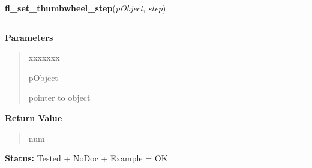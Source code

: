     \label{xformslib:library:fl_set_thumbwheel_step}

    \vspace{0.5ex}

\hspace{.8\funcindent}\begin{boxedminipage}{\funcwidth}

    \raggedright \textbf{fl\_set\_thumbwheel\_step}(\textit{pObject}, \textit{step})

    \vspace{-1.5ex}

    \rule{\textwidth}{0.5\fboxrule}
\setlength{\parskip}{2ex}
\setlength{\parskip}{1ex}
      \textbf{Parameters}
      \vspace{-1ex}

      \begin{quote}
        \begin{Ventry}{xxxxxxx}

          \item[pObject]

          pointer to object

        \end{Ventry}

      \end{quote}

      \textbf{Return Value}
    \vspace{-1ex}

      \begin{quote}
      num

      \end{quote}

\textbf{Status:} Tested + NoDoc + Example = OK



    \end{boxedminipage}

    \label{xformslib:library:fl_set_thumbwheel_return}

    \vspace{0.5ex}

